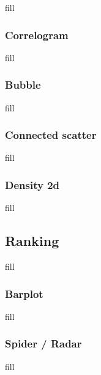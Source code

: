 \documentclass[
  b5paper]{book}
\begin{document}
fill

\hypertarget{correlogram}{%
\subsubsection*{Correlogram}\label{correlogram}}

fill

\hypertarget{bubble}{%
\subsubsection*{Bubble}\label{bubble}}

fill

\hypertarget{connected-scatter}{%
\subsubsection*{Connected scatter}\label{connected-scatter}}

fill

\hypertarget{density-2d}{%
\subsubsection*{Density 2d}\label{density-2d}}

fill

\hypertarget{ranking}{%
\subsection*{Ranking}\label{ranking}}

fill

\hypertarget{barplot}{%
\subsubsection*{Barplot}\label{barplot}}

fill

\hypertarget{spider-radar}{%
\subsubsection*{Spider / Radar}\label{spider-radar}}

fill
\end{document}
